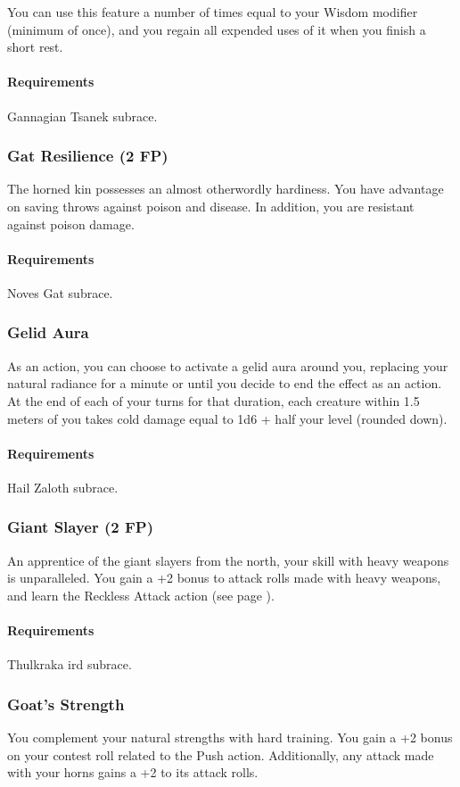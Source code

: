     You can use this feature a number of times equal to your Wisdom modifier (minimum of once), and you regain all expended uses of it when you finish a short rest.
    \paragraph{Requirements} Gannagian Tsanek subrace.
\subsubsection{Gat Resilience (2 FP)} \label{feat::gatresilience}
    The horned kin possesses an almost otherwordly hardiness.
    You have advantage on saving throws against poison and disease.
    In addition, you are resistant against poison damage.
    \paragraph{Requirements} Noves Gat subrace.
\subsubsection{Gelid Aura} \label{feat::gelidaura}
    As an action, you can choose to activate a gelid aura around you, replacing your natural radiance for a minute or until you decide to end the effect as an action.
    At the end of each of your turns for that duration, each creature within 1.5 meters of you takes cold damage equal to 1d6 + half your level (rounded down).
    \paragraph{Requirements} Hail Zaloth subrace.
\subsubsection{Giant Slayer (2 FP)} \label{feat::giantslayer}
    An apprentice of the giant slayers from the north, your skill with heavy weapons is unparalleled.
    You gain a +2 bonus to attack rolls made with heavy weapons, and learn the Reckless Attack action (see page \pageref{act::recklessattack}).
    \paragraph{Requirements} Thulkraka ird subrace.
\subsubsection{Goat's Strength} \label{feat::goatsstrength}
    You complement your natural strengths with hard training.
    You gain a +2 bonus on your contest roll related to the Push action.
    Additionally, any attack made with your horns gains a +2 to its attack rolls.

